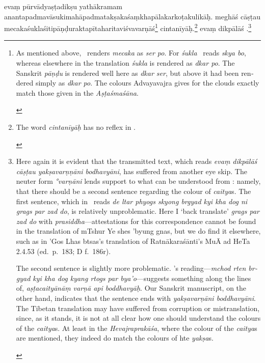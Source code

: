 \documentclass[naipra.tex]{subfiles}
\begin{document}
\begin{sanskrit}
\pstart
evaṃ pūrvādyaṣṭadikṣu yathākramam ananta\dsh padma\dsh vāsuki\dsh mahāpadma\dsh takṣaka\dsh śaṃkhapāla\dsh karkoṭa\dsh kulikāḥ.
meghāś cāṣṭau mecaka\dsh śukla\dsh śiti\dsh pāṇḍu\dsh rakta\dsh pīta\dsh harita\dsh viśvavarṇāś\footnote{
	\begin{english}%
		As mentioned above, \TIB\ renders \emph{mecaka} as \emph{ser po}.
		For \emph{śukla} \TIB\ reads \emph{skya bo}, whereas elsewhere in the translation \emph{śukla} is rendered as \emph{dkar po}.
		The Sanskrit \emph{pāṇḍu} is rendered well here as \emph{dkar ser}, but above it had been rendered simply as \emph{dkar po}.
		The colours Advayavajra gives for the clouds exactly match those given in the \emph{Aṣṭaśmaśāna}.
	\end{english}
} cintanīyāḥ.\footnote{
	\begin{english}%
		The word \emph{cintanīyāḥ} has no reflex in \TIB .
	\end{english}
}
evaṃ dikpālāś  .\footnote{
	\begin{english}%
		Here again it is evident that the transmitted text, which reads \emph{evaṃ dikpālāś cāṣṭau yakṣavarṇṇāni bodhavyāni}, has suffered from another eye skip.
		The neuter form \emph{°varṇāni} lends support to what can be understood from \TIB : namely, that there should be a second sentence regarding the colour of \emph{caitya}s.
		The first sentence, which in \TIB\ reads \emph{de ltar phyogs skyong brgyad kyi kha dog ni grags par zad do}, is relatively unproblematic.
		Here I `back translate' \emph{grags par zad do} with \emph{prasiddha}—attestations for this correspondence cannot be found in the translation of mTshur Ye shes 'byung gnas, but we do find it elsewhere, such as in 'Gos Lhas btsas's translation of Ratnākaraśānti's MuĀ ad HeTa 2.4.53 (ed.\ p.\ 183; D f.\ 186r).

		The second sentence is slightly more problematic.
		\TIB 's reading—\emph{mchod rten brgyad kyi kha dog kyang rtogs par bya'o}—suggests something along the lines of, \emph{aṣṭacaityānāṃ varṇā api boddhavyāḥ}.
		Our Sanskrit manuscript, on the other hand, indicates that the sentence ends with \emph{yakṣavarṇāni boddhavyāni}.
		The Tibetan translation may have suffered from corruption or mistranslation, since, as it stands, it is not at all clear how one should understand the colours of the \emph{caitya}s.
		At least in the \emph{Hevajraprakāśa}, where the colour of the \emph{caitya}s are mentioned, they indeed do match the colours of hte \emph{yakṣa}s.
	\end{english}
}
\pend


\end{sanskrit}
\end{document}
